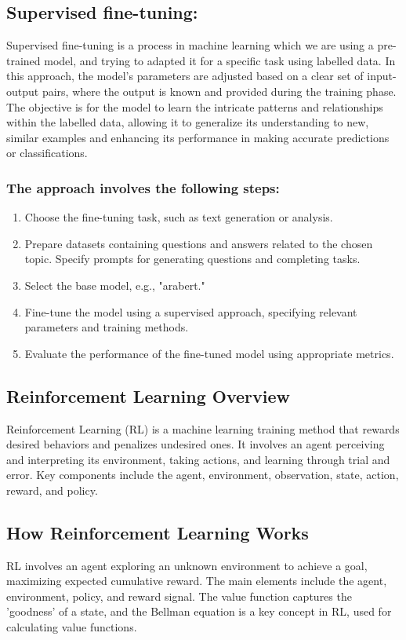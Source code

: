 \subsection{Supervised fine-tuning:}
Supervised fine-tuning is a process in machine learning which we are using a pre-trained model, and trying to adapted it for a specific task using labelled data. In this approach, the model's parameters are adjusted based on a clear set of input-output pairs, where the output is known and provided during the training phase. The objective is for the model to learn the intricate patterns and relationships within the labelled data, allowing it to generalize its understanding to new, similar examples and enhancing its performance in making accurate predictions or classifications.


\subsubsection {The approach involves the following steps:}
\begin{enumerate}
    \item Choose the fine-tuning task, such as text generation or analysis.
    \item Prepare datasets containing questions and answers related to the chosen topic. Specify prompts for generating questions and completing tasks.
    \item Select the base model, e.g., "arabert."
    \item Fine-tune the model using a supervised approach, specifying relevant parameters and training methods.
    \item Evaluate the performance of the fine-tuned model using appropriate metrics.
\end{enumerate}



\subsection {Reinforcement Learning Overview}
\cite{cruz2023reinforcement}
Reinforcement Learning (RL) is a machine learning training method that rewards desired behaviors and penalizes undesired ones. It involves an agent perceiving and interpreting its environment, taking actions, and learning through trial and error. Key components include the agent, environment, observation, state, action, reward, and policy.
\subsection*{How Reinforcement Learning Works}
RL involves an agent exploring an unknown environment to achieve a goal, maximizing expected cumulative reward. The main elements include the agent, environment, policy, and reward signal. The value function captures the 'goodness' of a state, and the Bellman equation is a key concept in RL, used for calculating value functions.

